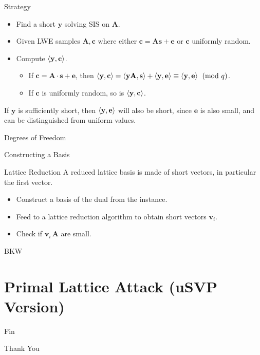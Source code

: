 \documentclass[presentation,smaller]{beamer}
\renewcommand{\vec}[1]{\mathbf{#1}\xspace}
\begin{document}
\begin{frame}[label={sec:org1937f59}]{Strategy}
\begin{itemize}
\item Find a short \(\vec{y}\) solving SIS on \(\vec{A}\).
\item Given LWE samples \(\vec{A}, \vec{c}\) where either \(\vec{c} = \vec{A}\vec{s} + \vec{e}\) or \(\vec{c}\) uniformly random.
\item Compute \(\Angle{\vec{y}, \vec{c}}\). 
\begin{itemize}
\item If \(\vec{c} = \vec{A} \cdot \vec{s} + \vec{e}\), then \(\Angle{\vec{y}, \vec{c}} = \Angle{\vec{y}\vec{A}, \vec{s}} + \Angle{\vec{y}, \vec{e}} \equiv \Angle{\vec{y}, \vec{e}} \pmod{q}\).
\item If \(\vec{c}\) is uniformly random, so is \(\Angle{\vec{y}, \vec{c}}\).
\end{itemize}
\end{itemize}

If \(\vec{y}\) is sufficiently short, then \(\Angle{\vec{y}, \vec{e}}\) will also be short, since \(\vec{e}\) is also small, and can be distinguished from uniform values.
\end{frame}

\begin{frame}[label={sec:org897ea0b}]{Degrees of Freedom}
\end{frame}
\begin{frame}[label={sec:org3cccd4a}]{Constructing a Basis}
\end{frame}
\begin{frame}[label={sec:orgddc5b70}]{Lattice Reduction}
A \alert{reduced lattice} basis is made of short vectors, in particular the first vector.
\begin{itemize}
\item Construct a basis of the dual from the instance.
\item Feed to a lattice reduction algorithm to obtain short vectors \(\vec{v}_i\).
\item Check if \(\vec{v}_i\, \vec{A}\) are small.
\end{itemize}
\end{frame}

\begin{frame}[label={sec:orge5d246f}]{BKW}
\end{frame}
\section{Primal Lattice Attack (uSVP Version)}
\label{sec:orgac664b3}

\begin{frame}[standout,label={sec:org4463593}]{Fin}
\begin{center}
\Huge \alert{Thank You}
\end{center}
\end{frame}
\end{document}

